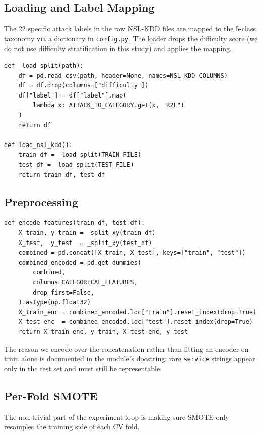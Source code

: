 \documentclass[11pt, a4paper]{article}
\begin{document}
\subsection{Loading and Label Mapping}
The 22 specific attack labels in the raw NSL-KDD files are mapped to the 5-class taxonomy via a dictionary in \texttt{config.py}. The loader drops the difficulty score (we do not use difficulty stratification in this study) and applies the mapping.

\begin{lstlisting}[caption={Loading and 5-class mapping (data\_loader.py).}]
def _load_split(path):
    df = pd.read_csv(path, header=None, names=NSL_KDD_COLUMNS)
    df = df.drop(columns=["difficulty"])
    df["label"] = df["label"].map(
        lambda x: ATTACK_TO_CATEGORY.get(x, "R2L")
    )
    return df

def load_nsl_kdd():
    train_df = _load_split(TRAIN_FILE)
    test_df = _load_split(TEST_FILE)
    return train_df, test_df
\end{lstlisting}

\subsection{Preprocessing}
\begin{lstlisting}[caption={One-hot encoding over the union of train/test categories (preprocess.py).}]
def encode_features(train_df, test_df):
    X_train, y_train = _split_xy(train_df)
    X_test,  y_test  = _split_xy(test_df)
    combined = pd.concat([X_train, X_test], keys=["train", "test"])
    combined_encoded = pd.get_dummies(
        combined,
        columns=CATEGORICAL_FEATURES,
        drop_first=False,
    ).astype(np.float32)
    X_train_enc = combined_encoded.loc["train"].reset_index(drop=True)
    X_test_enc  = combined_encoded.loc["test"].reset_index(drop=True)
    return X_train_enc, y_train, X_test_enc, y_test
\end{lstlisting}

The reason we encode over the concatenation rather than fitting an encoder on train alone is documented in the module's docstring: rare \texttt{service} strings appear only in the test set and must still be representable.

\subsection{Per-Fold SMOTE}
The non-trivial part of the experiment loop is making sure SMOTE only resamples the training side of each CV fold.
\end{document}
